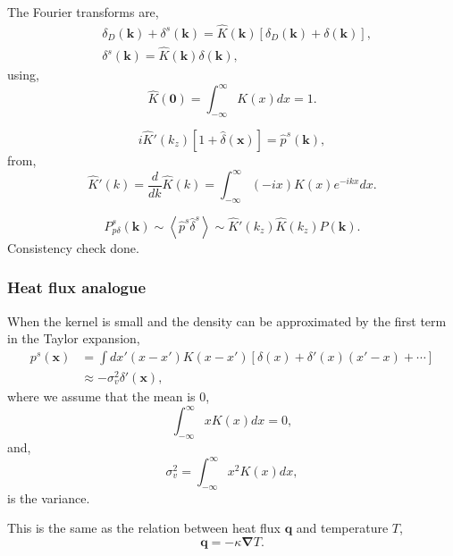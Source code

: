 \documentclass[a4paper,11pt, fleqn]{article}
\begin{document}
The Fourier transforms are,
\begin{align}
  &\delta_D(\bm{k}) + \delta^s(\bm{k}) =
  \hat{K}(\bm{k}) \left[
    \delta_D(\bm{k}) + \delta(\bm{k}) \right],\\
  &\delta^s(\bm{k}) = \hat{K}(\bm{k}) \delta(\bm{k}),
\end{align}
using,
\begin{equation}
  \hat{K}(\bm{0}) = \int_{-\infty}^\infty K(x) dx = 1.
\end{equation}

\begin{equation}
  i \hat{K}'(k_z) [ 1 + \hat{\delta}(\bm{x}) ] = \hat{p}^s(\bm{k}),
\end{equation}
from,
\begin{equation}
  \hat{K}'(k) = \frac{d}{dk} \hat{K}(k)
  = \int_{-\infty}^\infty (-i x) K(x) e^{-ik x} dx.
\end{equation}

\begin{equation}
  P^s_{p\delta}(\bm{k}) \sim \left\langle \hat{p}^s \hat{\delta}^s \right\rangle
  \sim \hat{K}'(k_z) \hat{K}(k_z) P(\bm{k}).
\end{equation}
Consistency check done.

\subsubsection{Heat flux analogue}

When the kernel is small and the density can be approximated by the first
term in the Taylor expansion,
\begin{equation}\begin{split}
  p^s(\bm{x})
  &= \int dx' (x - x') K(x - x') \left[
    \delta(x) + \delta'(x) (x' - x) + \cdots \right]\\
  &\approx -\sigma_v^2 \delta'(\bm{x}),
\end{split}\end{equation}
where we assume that the mean is 0,
\begin{equation}
  \int_{-\infty}^\infty x K(x) dx = 0,
\end{equation}
and,
\begin{equation}
  \sigma_v^2 = \int_{-\infty}^\infty x^2 K(x) dx,
\end{equation}
is the variance.

This is the same as the relation between heat flux $\bm{q}$ and
temperature $T$,
\begin{equation}
  \bm{q} = -\kappa \bm{\nabla} T.
\end{equation}
\end{document}
